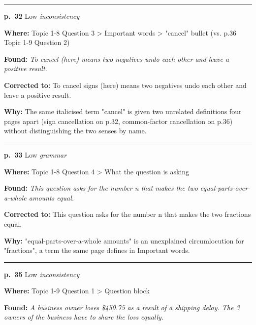 \documentclass[11pt]{article}
\newcommand{\sevlow}[1]{\textcolor{black!55}{#1}}
\begin{document}
\noindent\rule{\textwidth}{0.4pt}\par\nobreak\vspace{2pt}
\noindent\textbf{p.~32} \quad \sevlow{Low} \quad \textit{inconsistency}\par
\noindent\textbf{Where: }Topic 1-8 Question 3 > Important words > "cancel" bullet (vs. p.36 Topic 1-9 Question 2)\par
\noindent\textbf{Found: }\textit{To cancel (here) means two negatives undo each other and leave a positive result.}\par
\noindent\textbf{Corrected to: }To cancel signs (here) means two negatives undo each other and leave a positive result.\par
\noindent\textbf{Why: }The same italicised term "cancel" is given two unrelated definitions four pages apart (sign cancellation on p.32, common-factor cancellation on p.36) without distinguishing the two senses by name.\par\vspace{4pt}
\noindent\rule{\textwidth}{0.4pt}\par\nobreak\vspace{2pt}
\noindent\textbf{p.~33} \quad \sevlow{Low} \quad \textit{grammar}\par
\noindent\textbf{Where: }Topic 1-8 Question 4 > What the question is asking\par
\noindent\textbf{Found: }\textit{This question asks for the number n that makes the two equal-parts-over-a-whole amounts equal.}\par
\noindent\textbf{Corrected to: }This question asks for the number n that makes the two fractions equal.\par
\noindent\textbf{Why: }"equal-parts-over-a-whole amounts" is an unexplained circumlocution for "fractions", a term the same page defines in Important words.\par\vspace{4pt}
\noindent\rule{\textwidth}{0.4pt}\par\nobreak\vspace{2pt}
\noindent\textbf{p.~35} \quad \sevlow{Low} \quad \textit{inconsistency}\par
\noindent\textbf{Where: }Topic 1-9 Question 1 > Question block\par
\noindent\textbf{Found: }\textit{A business owner loses \$450.75 as a result of a shipping delay. The 3 owners of the business have to share the loss equally.}\par
\end{document}
